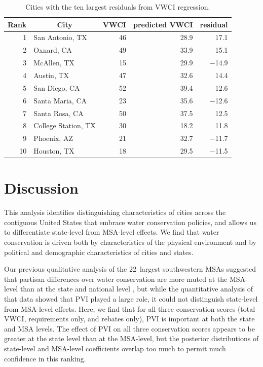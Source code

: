 \documentclass[draft,linenumbers]{agujournal}\usepackage{knitr}
\begin{document}
%
%
\begin{table}[tbp]
\centering
\caption{Cities with the ten largest residuals from VWCI regression.}
\label{tab:vwci_top_residuals}
\begin{tabular}{rlrrr}
  \hline
\multicolumn{1}{c}{ Rank } & \multicolumn{1}{c}{ City } & \multicolumn{1}{c}{ VWCI } & \multicolumn{1}{c}{ predicted VWCI } & \multicolumn{1}{c}{ residual } \\
  \hline
 1 & San Antonio, TX & 46 & 28.9 & 17.1 \\
   2 & Oxnard, CA & 49 & 33.9 & 15.1 \\
   3 & McAllen, TX & 15 & 29.9 & $-$14.9 \\
   4 & Austin, TX & 47 & 32.6 & 14.4 \\
   5 & San Diego, CA & 52 & 39.4 & 12.6 \\
   6 & Santa Maria, CA & 23 & 35.6 & $-$12.6 \\
   7 & Santa Rosa, CA & 50 & 37.5 & 12.5 \\
   8 & College Station, TX & 30 & 18.2 & 11.8 \\
   9 & Phoenix, AZ & 21 & 32.7 & $-$11.7 \\
  10 & Houston, TX & 18 & 29.5 & $-$11.5 \\
   \hline
\end{tabular}
\end{table}


\section{Discussion}

This analysis identifies distinguishing characteristics of cities across the contiguous United States that embrace water conservation policies, and allows us to differentiate state-level from MSA-level effects. We find that water conservation is driven both by characteristics of the physical environment and by political and demographic
characteristics of cities and states.

Our previous qualitative analysis of the 22~largest southwestern MSAs suggested that partisan differences over water conservation are more muted at the MSA-level than at the state and national level \citep{hess_drought_2016}, but while the quantitative analysis of that data showed that PVI played a large role, it could not distinguish state-level from MSA-level effects. Here, we find that for all three conservation scores (total VWCI, requirements only, and rebates only), PVI is important at both the state and MSA levels. The effect of PVI on all three conservation scores appears to be greater at the state level than at the MSA-level, but the posterior distributions of state-level and MSA-level coefficients overlap too much to permit much confidence in this ranking.
\end{document}
